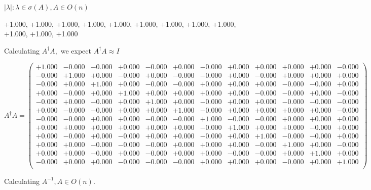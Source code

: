 \documentclass[9pt]{article}
\theoremstyle{plain}
\theoremstyle{definition}
\theoremstyle{remark}
\numberwithin{equation}{section}
\begin{document}
 $|\lambda | : \lambda \in \sigma(A) , A \in O(n)$

+1.000, +1.000, +1.000, +1.000, +1.000, +1.000, +1.000, +1.000, +1.000, +1.000, +1.000, +1.000


Calculating $A^{\dag} A,$  we expect $A^{\dag} A \approx I$

$A^{\dag} A = \left(
\begin{array}{
cccccccccccc}
+1.000 & -0.000 & -0.000 & +0.000 & -0.000 & +0.000 & -0.000 & +0.000 & +0.000 & +0.000 & +0.000 & -0.000 \\
-0.000 & +1.000 & +0.000 & -0.000 & +0.000 & -0.000 & -0.000 & +0.000 & -0.000 & +0.000 & +0.000 & +0.000 \\
-0.000 & +0.000 & +1.000 & +0.000 & -0.000 & -0.000 & +0.000 & +0.000 & +0.000 & -0.000 & -0.000 & +0.000 \\
+0.000 & -0.000 & +0.000 & +1.000 & +0.000 & +0.000 & +0.000 & +0.000 & -0.000 & -0.000 & +0.000 & -0.000 \\
-0.000 & +0.000 & -0.000 & +0.000 & +1.000 & +0.000 & -0.000 & +0.000 & +0.000 & -0.000 & -0.000 & -0.000 \\
+0.000 & -0.000 & -0.000 & +0.000 & +0.000 & +1.000 & -0.000 & +0.000 & +0.000 & +0.000 & +0.000 & -0.000 \\
-0.000 & -0.000 & +0.000 & +0.000 & -0.000 & -0.000 & +1.000 & -0.000 & -0.000 & +0.000 & +0.000 & +0.000 \\
+0.000 & +0.000 & +0.000 & +0.000 & +0.000 & +0.000 & -0.000 & +1.000 & +0.000 & +0.000 & -0.000 & +0.000 \\
+0.000 & -0.000 & +0.000 & -0.000 & +0.000 & +0.000 & -0.000 & +0.000 & +1.000 & -0.000 & -0.000 & +0.000 \\
+0.000 & +0.000 & -0.000 & -0.000 & -0.000 & +0.000 & +0.000 & +0.000 & -0.000 & +1.000 & +0.000 & -0.000 \\
+0.000 & +0.000 & -0.000 & +0.000 & -0.000 & +0.000 & +0.000 & -0.000 & -0.000 & +0.000 & +1.000 & +0.000 \\
-0.000 & +0.000 & +0.000 & -0.000 & -0.000 & -0.000 & +0.000 & +0.000 & +0.000 & -0.000 & +0.000 & +1.000 \\
\end{array}
\right)$ \newline 

Calculating $A^{-1} ,  A \in O(n)$.
\end{document}
